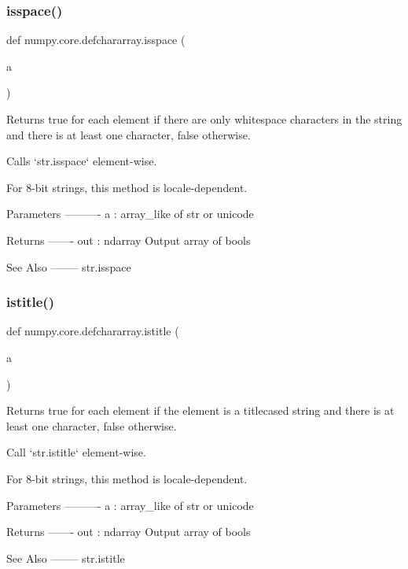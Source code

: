 \subsubsection{\texorpdfstring{isspace()}{isspace()}}
{\footnotesize\ttfamily def numpy.\+core.\+defchararray.\+isspace (\begin{DoxyParamCaption}\item[{}]{a }\end{DoxyParamCaption})}

\begin{DoxyVerb}Returns true for each element if there are only whitespace
characters in the string and there is at least one character,
false otherwise.

Calls `str.isspace` element-wise.

For 8-bit strings, this method is locale-dependent.

Parameters
----------
a : array_like of str or unicode

Returns
-------
out : ndarray
    Output array of bools

See Also
--------
str.isspace
\end{DoxyVerb}
 \mbox{\label{namespacenumpy_1_1core_1_1defchararray_aa22aba114aad6627f77db9043334d4b4}} 
\subsubsection{\texorpdfstring{istitle()}{istitle()}}
{\footnotesize\ttfamily def numpy.\+core.\+defchararray.\+istitle (\begin{DoxyParamCaption}\item[{}]{a }\end{DoxyParamCaption})}

\begin{DoxyVerb}Returns true for each element if the element is a titlecased
string and there is at least one character, false otherwise.

Call `str.istitle` element-wise.

For 8-bit strings, this method is locale-dependent.

Parameters
----------
a : array_like of str or unicode

Returns
-------
out : ndarray
    Output array of bools

See Also
--------
str.istitle
\end{DoxyVerb}
 \mbox{\label{namespacenumpy_1_1core_1_1defchararray_a631a6113cb84184964d4b1b7ca2acfbd}} 

